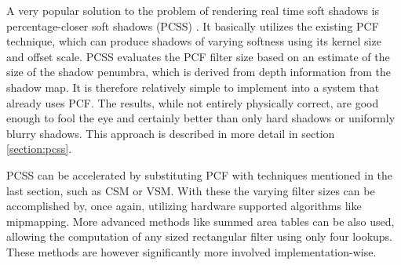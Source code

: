 A very popular solution to the problem of rendering real time soft shadows is percentage-closer soft shadows (PCSS) \cite{bib:proc:fernando_pcss}. It basically utilizes the existing PCF technique, which can produce shadows of varying softness using its kernel size and offset scale. PCSS evaluates the PCF filter size based on an estimate of the size of the shadow penumbra, which is derived from depth information from the shadow map. It is therefore relatively simple to implement into a system that already uses PCF. The results, while not entirely physically correct, are good enough to fool the eye and certainly better than only hard shadows or uniformly blurry shadows. This approach is described in more detail in section \ref{section:pcss}.

PCSS can be accelerated by substituting PCF with techniques mentioned in the last section, such as CSM or VSM. With these the varying filter sizes can be accomplished by, once again, utilizing hardware supported algorithms like mipmapping. More advanced methods like summed area tables can be also used, allowing the computation of any sized rectangular filter using only four lookups. These methods are however significantly more involved implementation-wise.






